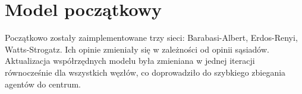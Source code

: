 \section{Model początkowy}

Początkowo zostały zaimplementowane trzy sieci: Barabasi-Albert, Erdos-Renyi, Watts-Strogatz.
Ich opinie zmieniały się w zależności od opinii sąsiadów.
Aktualizacja współrzędnych modelu była zmieniana w jednej iteracji równocześnie dla wszystkich węzłów, co doprowadziło do szybkiego zbiegania agentów do centrum.